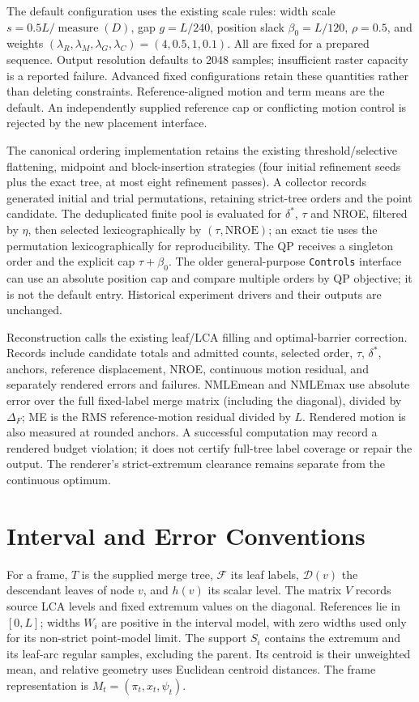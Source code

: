 \documentclass[10pt]{article}
\begin{document}
The default configuration uses the existing scale rules: width scale $s=0.5L/\operatorname{measure}(D)$, gap $g=L/240$, position slack $\beta_0=L/120$, $\rho=0.5$, and weights $(\lambda_R,\lambda_M,\lambda_G,\lambda_C)=(4,0.5,1,0.1)$. All are fixed for a prepared sequence. Output resolution defaults to 2048 samples; insufficient raster capacity is a reported failure. Advanced fixed configurations retain these quantities rather than deleting constraints. Reference-aligned motion and term means are the default. An independently supplied reference cap or conflicting motion control is rejected by the new placement interface.

The canonical ordering implementation retains the existing threshold/selective flattening, midpoint and block-insertion strategies (four initial refinement seeds plus the exact tree, at most eight refinement passes). A collector records generated initial and trial permutations, retaining strict-tree orders and the point candidate. The deduplicated finite pool is evaluated for $\delta^*$, $\tau$ and NROE, filtered by $\eta$, then selected lexicographically by $(\tau,\mathrm{NROE})$; an exact tie uses the permutation lexicographically for reproducibility. The QP receives a singleton order and the explicit cap $\tau+\beta_0$. The older general-purpose \texttt{Controls} interface can use an absolute position cap and compare multiple orders by QP objective; it is not the default entry. Historical experiment drivers and their outputs are unchanged.

Reconstruction calls the existing leaf/LCA filling and optimal-barrier correction. Records include candidate totals and admitted counts, selected order, $\tau$, $\delta^*$, anchors, reference displacement, NROE, continuous motion residual, and separately rendered errors and failures. NMLEmean and NMLEmax use absolute error over the full fixed-label merge matrix (including the diagonal), divided by $\Delta_F$; ME is the RMS reference-motion residual divided by $L$. Rendered motion is also measured at rounded anchors. A successful computation may record a rendered budget violation; it does not certify full-tree label coverage or repair the output. The renderer's strict-extremum clearance remains separate from the continuous optimum.

\section{Interval and Error Conventions}\label{sec:interval}
For a frame, $T$ is the supplied merge tree, $\mathcal{F}$ its leaf labels, $\mathcal{D}(v)$ the descendant leaves of node $v$, and $h(v)$ its scalar level. The matrix $V$ records source LCA levels and fixed extremum values on the diagonal. References lie in $[0,L]$; widths $W_i$ are positive in the interval model, with zero widths used only for its non-strict point-model limit. The support $S_i$ contains the extremum and its leaf-arc regular samples, excluding the parent. Its centroid is their unweighted mean, and relative geometry uses Euclidean centroid distances. The frame representation is $M_t=(\pi_t,x_t,\psi_t)$.
\end{document}

